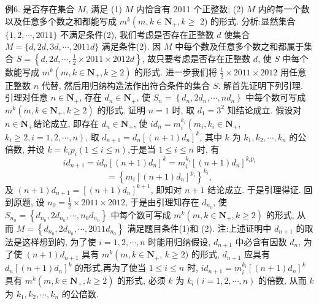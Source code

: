 例6. 是否存在集合 $M$, 满足
(1) $M$ 内恰含有 2011 个正整数;
(2) $M$ 内的每一个数以及任意多个数之和都能写成 $m^k\left(m, k \in \mathbf{N}_{+}, k \geqslant\right.$ 2) 的形式.
分析:显然集合 $\{1,2, \cdots, 2011\}$ 不满足条件(2), 我们考虑是否存在正整数 $d$ 使集合 $M=\{d, 2 d, 3 d, \cdots, 2011 d\}$ 满足条件(2). 因 $M$ 中每个数及任意多个数之和都属于集合 $S=\left\{d, 2 d, \cdots, \frac{1}{2} \times 2011 \times 2012 d\right\}$, 故只要考虑是否存在正整数 $d$, 使 $S$ 中每个数能写成 $m^k\left(m, k \in \mathbf{N}_{+}, k \geqslant 2\right)$ 的形式.
进一步我们将 $\frac{1}{2} \times 2011 \times 2012$ 用任意正整数 $n$ 代替, 然后用归纳构造法作出符合条件的集合 $S$.
解首先证明下列引理.
引理对任意 $n \in \mathbf{N}_{+}$, 存在 $d_n \in \mathbf{N}_{+}$, 使 $S_n=\left\{d_n, 2 d_n, \cdots, n d_n\right\}$ 中每个数可写成 $m^k\left(m, k \in \mathbf{N}_{+}, k \geqslant 2\right)$ 的形式.
证明 $n=1$ 时, 取 $d_1=3^2$ 知结论成立.
假设对 $n \in \mathbf{N}_{+}$结论成立, 即存在 $d_n \in \mathbf{N}_{+}$, 使 $i d_n=m_i^{k_i}\left(m_i, k_i \in \mathbf{N}_{+}\right.$, $\left.k_i \geqslant 2, i=1,2, \cdots, n\right)$, 取 $d_{n+1}=d_n\left[(n+1) d_n\right]^k$, 其中 $k$ 为 $k_1, k_2, \cdots, k_n$ 的公倍数, 并设 $k=k_i p_i(1 \leqslant i \leqslant n)$,于是当 $1 \leqslant i \leqslant n$ 时, 有
$$
i d_{n+1}=i d_n\left[(n+1) d_n\right]^k=m_i^{k_i}\left[(n+1) d_n\right]^{k_i p_i}
$$
$$
=\left\{m_i\left[(n+1) d_n\right]^{p_i}\right\}^{k_i},
$$
及 $(n+1) d_{n+1}=\left[(n+1) d_n\right]^{k+1}$, 即知对 $n+1$ 结论成立.
于是引理得证.
回到原题, 设 $n_0=\frac{1}{2} \times 2011 \times 2012$, 于是由引理知存在 $d_{n_0}$, 使 $S_{n_0}= \left\{d_{n_0}, 2 d_{n_0}, \cdots, n_0 d_{n_0}\right\}$ 中每个数可写成 $m^k\left(m, k \in \mathbf{N}_{+}, k \geqslant 2\right)$ 的形式, 从而 $M=\left\{d_{n_0}, 2 d_{n_0}, \cdots, 2011 d_{n_0}\right\}$ 满足题目条件(1)和 (2).
注:上述证明中 $d_{n+1}$ 的取法是这样想到的, 为了使 $i=1,2, \cdots, n$ 时能用归纳假设, $d_{n+1}$ 中必含有因数 $d_n$, 为了使 $(n+1) d_{n+1}$ 具有 $m^k\left(m, k \in \mathbf{N}_{+}\right.$, $k \geqslant 2)$ 的形式, $d_{n+1}$ 应具有 $d_n\left[(n+1) d_n\right]^k$ 的形式,再为了使当 $1 \leqslant i \leqslant n$ 时, $i d_{n+1}=m_i^{k_i}\left[(n+1) d_n\right]^k$ 具有 $m^k\left(m, k \in \mathbf{N}_{+}, k \geqslant 2\right)$ 的形式, 必须 $k$ 为 $k_i(i= 1,2, \cdots, n)$ 的倍数, 从而 $k$ 为 $k_1, k_2, \cdots, k_n$ 的公倍数.


